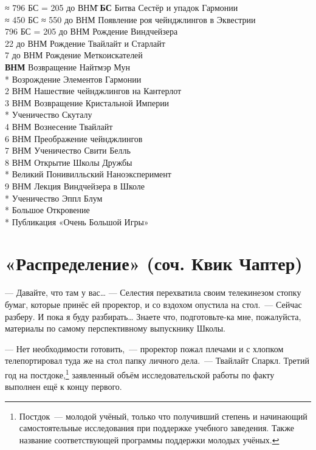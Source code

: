\documentclass[fontsize=11pt,a5paper,titlepage=firstcover]{scrbook}
\begin{document}
\begin{tabbing}
	≈ 796 БС = 205 до ВНМ\hspace{1em}\=\kill
	\textbf{БС} \> Битва Сестёр и упадок Гармонии\\[\ado]
	≈ 450 БС ≈ 550 до ВНМ \> Появление роя чейнджлингов в Эквестрии\\[\ado]
	796 БС = 205 до ВНМ \> Рождение Виндчейзера\\[\ado]
	22 до ВНМ \> Рождение Твайлайт и Старлайт\\[\ado]
	7 до ВНМ \> Рождение Меткоискателей\\[\ado]
	\textbf{ВНМ} \> Возвращение Найтмэр Мун\\*
	  \> Возрождение Элементов Гармонии\\[\ado]
	2 ВНМ \> Нашествие чейнджлингов на Кантерлот\\[\ado]
	3 ВНМ \> Возвращение Кристальной Империи\\*
	       \> Ученичество Скуталу\\[\ado]
	4 ВНМ \> Вознесение Твайлайт\\[\ado]
	6 ВНМ \> Преображение чейнджлингов\\[\ado]
	7 ВНМ \> Ученичество Свити Белль\\[\ado]
	8 ВНМ \> Открытие Школы Дружбы\\*
	      \> Великий Понивилльский Наноэксперимент\\[\ado]
	9 ВНМ \> Лекция Виндчейзера в Школе\\*
	      \> Ученичество Эппл Блум\\*
	      \> Большое Откровение\\*
	      \> Публикация «Очень Большой Игры»
\end{tabbing} 


\chapter*{«Распределение» (соч. Квик Чаптер)}\label{raspredelenie}

--- Давайте, что там у вас{\ldots} --- Селестия перехватила своим телекинезом стопку бумаг, которые принёс ей проректор, и со вздохом опустила на стол.~--- Сейчас разберу. И пока я буду разбирать{\ldots} Знаете что, подготовьте-ка мне, пожалуйста, материалы по самому перспективному выпускнику Школы.

--- Нет необходимости готовить,~--- проректор пожал плечами и с хлопком телепортировал туда же на стол папку личного дела.~--- Твайлайт Спаркл. Третий год на постдоке,\footnote{Постдок --- молодой учёный, только что получивший степень и начинающий самостоятельные исследования при поддержке учебного заведения. Также название соответствующей программы поддержки молодых учёных.} заявленный объём исследовательской работы по факту выполнен ещё к концу первого.
\end{document}
